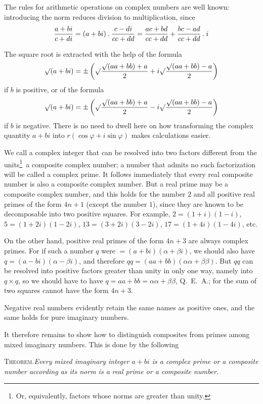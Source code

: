 %
The rules for arithmetic operations on complex numbers are well known: introducing the norm reduces division to multiplication, since
\[
\frac{a+bi}{c+di}=(a+bi)\mathbin{.}\frac{c-di}{cc+dd}=\frac{ac+bd}{cc+dd}+\frac{bc-ad}{cc+dd}\mathbin{.} i
\]

The square root is extracted with the help of the formula
\[
\surd(a+bi)=\pm\left(\surd\frac{\surd(aa+bb)+a}{2}+i\surd\frac{\surd(aa+bb)-a}{2}\right)
\]
if $b$ is positive, or of the formula
\[
\surd(a+bi)=\pm\left(\surd\frac{\surd(aa+bb)+a}{2}-i\surd\frac{\surd(aa+bb)-a}{2}\right)
\]
if $b$ is negative. There is no need to dwell here on how transforming the complex quantity $a+bi$ into $r(\cos\varphi+i\sin\varphi)$ makes calculations easier.

We call a complex integer that can be resolved into two factors different from the units\begingroup\renewcommand{\thefootnote}{*)}\footnote{Or, equivalently, factors whose norms are greater than unity.}\endgroup\ a composite complex number; a number that admits no such factorization will be called a complex prime. It follows immediately that every real composite number is also a composite complex number. But a real prime may be a composite complex number, and this holds for the number $2$ and all positive real primes of the form $4n+1$ (except the number $1$), since they are known to be decomposable into two positive squares. For example, $2=(1+i)(1-i)$, $5=(1+2i)(1-2i)$, $13=(3+2i)(3-2i)$, $17=(1+4i)(1-4i)$, etc.

On the other hand, positive real primes of the form $4n+3$ are always complex primes. For if such a number $q$ were $=(a+bi)(\alpha+\beta i)$, we should also have $q=(a-bi)(\alpha-\beta i)$, and therefore $qq=(aa+bb)(\alpha\alpha+\beta\beta)$. But $qq$ can be resolved into positive factors greater than unity in only one way, namely into $q\times q$, so we should have to have $q=aa+bb=\alpha\alpha+\beta\beta$, \mbox{Q. E. A.}; for the sum of two squares cannot have the form $4n+3$.

%
Negative real numbers evidently retain the same names as positive ones, and the same holds for pure imaginary numbers.

It therefore remains to show how to distinguish composites from primes among mixed imaginary numbers. This is done by the following

\textsc{Theorem.}\quad\emph{Every mixed imaginary integer $a+bi$ is a complex prime or a composite number according as its norm is a real prime or a composite number.}

